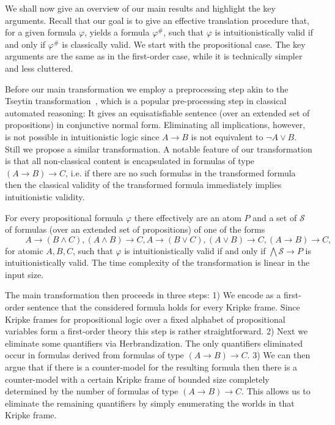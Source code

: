 \documentclass[runningheads]{llncs}
\begin{document}
We shall now give an overview of our main results and highlight the key arguments. Recall that our goal is to give an effective translation procedure that, for a given formula $\varphi$, yields a formula $\varphi^\#$, such that $\varphi$ is intuitionistically valid if and only if $\varphi^\#$ is classically valid. We start with the propositional case. The key arguments are the same as in the first-order case, while it is technically simpler and less cluttered.

Before our main transformation we employ a preprocessing step akin to the Tseytin transformation~\cite{tseitin1983complexity}, which is a popular pre-processing step in classical automated reasoning:
It gives an equisatisfiable sentence (over an extended set of propositions) in conjunctive normal form.
Eliminating all implications, however, is not possible in intuitionistic logic since $A\to B$ is not equivalent to $\neg A\vee B$.
Still we propose a similar transformation.
A notable feature of our transformation is that all non-classical content is encapsulated in formulas of type $(A\to B)\to C$, i.e. if there are no such formulas in the transformed formula then the classical validity of the transformed formula immediately implies intuitionistic validity.

\begin{theorem}\label{thm:Tseytin}
For every propositional formula $\varphi$ there effectively are an atom $P$ and a set of $\mathcal S$ of formulas (over an extended set of propositions) of one of the forms\\
$\hspace{1cm} A\to (B\wedge C), (A\wedge B)\to C, A\to (B\vee C), (A\vee B)\to C, (A\to B)\to C,$\\
for atomic $A, B, C$, such that $\varphi$ is intuitionistically valid if and only if $\bigwedge\mathcal S\to P$ is intuitionistically valid. The time complexity of the transformation is linear in the input size.
\end{theorem}

The main transformation then proceeds in three steps:
%
1) We encode as a first-order sentence that the considered formula holds for every Kripke frame.
Since Kripke frames for propositional logic over a fixed alphabet of propositional variables form a first-order theory this step is rather straightforward.
%
2) Next we eliminate some quantifiers via Herbrandization. The only quantifiers eliminated occur in formulas derived from formulas of type $(A\to B)\to C$.
%
3) We can then argue that if there is a counter-model for the resulting formula then there is a counter-model with a certain Kripke frame of bounded size completely determined by the number of formulas of type $(A\to B)\to C$.
This allows us to eliminate the remaining quantifiers by simply enumerating the worlds in that Kripke frame.
\end{document}
